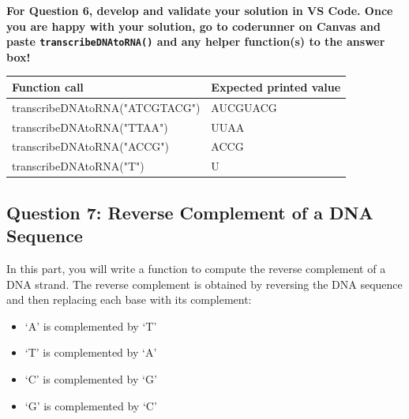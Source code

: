 \textbf{For Question 6, develop and validate your solution in VS Code. Once you are happy with your solution, go to coderunner on Canvas and paste \texttt{transcribeDNAtoRNA()} and any helper function(s) to the answer box!}  


\begin{sampleProject}
    \hspace{0pt}
    \begin{longtable}{|p{2.6in}|p{2.5in}|}
        \hline
        \textbf{Function call}
            & 
            \textbf{Expected printed value}
            \\ \hline
        
        transcribeDNAtoRNA("ATCGTACG")
            & 
            AUCGUACG
            \\ \hline
        
        transcribeDNAtoRNA("TTAA")
            & 
            UUAA
            \\ \hline
        
        transcribeDNAtoRNA("ACCG")
            & 
            ACCG
            \\ \hline

        transcribeDNAtoRNA("T")
            & 
            U
            \\ \hline
    \end{longtable}
\end{sampleProject}

\hspace{15pt}

\subsection{Question 7: Reverse Complement of a DNA Sequence}

In this part, you will write a function to compute the reverse complement of a DNA strand. The reverse complement is obtained by reversing the DNA sequence and then replacing each base with its complement:
\begin{itemize}[left=1cm]
    \item `A' is complemented by `T'
    \item `T' is complemented by `A'
    \item `C' is complemented by `G'
    \item `G' is complemented by `C'
\end{itemize}

